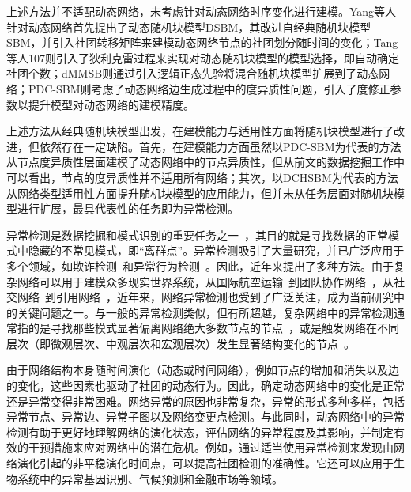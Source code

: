 上述方法并不适配动态网络，未考虑针对动态网络时序变化进行建模。Yang等人针对动态网络首先提出了动态随机块模型DSBM\cite{yang2011detecting}，其改进自经典随机块模型SBM，并引入社团转移矩阵来建模动态网络节点的社团划分随时间的变化；Tang等人107则引入了狄利克雷过程来实现对动态随机块模型的模型选择，即自动确定社团个数；dMMSB\cite{xing2010state}则通过引入逻辑正态先验将混合随机块模型扩展到了动态网络；PDC-SBM\cite{riverain2023poisson}则考虑了动态网络边生成过程中的度异质性问题，引入了度修正参数以提升模型对动态网络的建模精度。

上述方法从经典随机块模型出发，在建模能力与适用性方面将随机块模型进行了改进，但依然存在一定缺陷。首先，在建模能力方面虽然以PDC-SBM为代表的方法从节点度异质性层面建模了动态网络中的节点异质性，但从前文的数据挖掘工作中可以看出，节点的度异质性并不适用所有网络；其次，以DCHSBM为代表的方法从网络类型适用性方面提升随机块模型的应用能力，但并未从任务层面对随机块模型进行扩展，最具代表性的任务即为异常检测。


异常检测是数据挖掘和模式识别的重要任务之一~\cite{chandola2009anomaly,he2024diffusion}，其目的就是寻找数据的正常模式中隐藏的不常见模式，即“离群点”。异常检测吸引了大量研究，并已广泛应用于多个领域，如欺诈检测~\cite{xu2024revisiting}和异常行为检测~\cite{amraee2018anomaly}。因此，近年来提出了多种方法。由于复杂网络可以用于建模众多现实世界系统，从国际航空运输~\cite{kasai2016network}到团队协作网络~\cite{dai2024gated}，从社交网络~\cite{singh2024social}到引用网络~\cite{yan2024modeling}，近年来，网络异常检测也受到了广泛关注，成为当前研究中的关键问题之一。与一般的异常检测类似，但有所超越，复杂网络中的异常检测通常指的是寻找那些模式显著偏离网络绝大多数节点的节点~\cite{lim2024future,li2024unsupervised}，或是触发网络在不同层次（即微观层次、中观层次和宏观层次）发生显著结构变化的节点~\cite{hayat2024deep}。



由于网络结构本身随时间演化（动态或时间网络）\cite{huang2015triadic}，例如节点的增加和消失以及边的变化，这些因素也驱动了社团的动态行为。因此，确定动态网络中的变化是正常还是异常变得非常困难。网络异常的原因也非常复杂，异常的形式多种多样，包括异常节点、异常边、异常子图以及网络变更点检测\cite{huang2020laplacian}。与此同时，动态网络中的异常检测有助于更好地理解网络的演化状态，评估网络的异常程度及其影响，并制定有效的干预措施来应对网络中的潜在危机。例如，通过适当使用异常检测来发现由网络演化引起的非平稳演化时间点，可以提高社团检测的准确性。它还可以应用于生物系统中的异常基因识别、气候预测和金融市场等领域。

